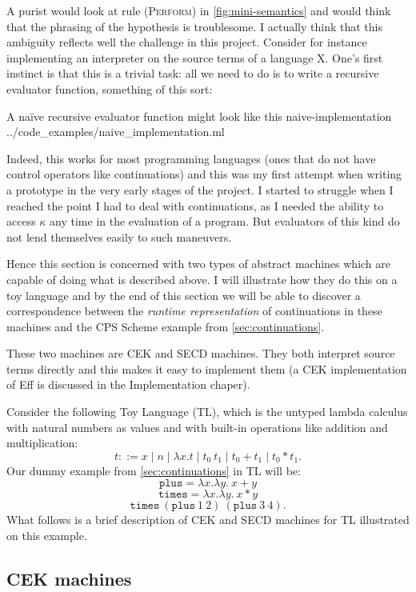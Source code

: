 \documentclass[class=article, crop=false]{standalone}
\begin{document}
A purist would look at rule \textsc{(Perform)} in \autoref{fig:mini-semantics}
and would think that the phrasing of the hypothesis is troublesome. I actually
think that this ambiguity reflects well the challenge in this project. Consider
for instance implementing an interpreter on the source terms of a language X.
One's first instinct is that this is a trivial task: all we need to do is to
write a recursive evaluator function, something of this sort:

{A naïve recursive evaluator function might look like this}
{naive-implementation}
{../code_examples/naive_implementation.ml}

Indeed, this works for most programming languages (ones that do not have control
operators like continuations) and this was my first attempt when writing a
 prototype in the very early stages of the project. I started to struggle
when I reached the point I had to deal with continuations, as I needed the
ability to access $\kappa$ any time in the evaluation of a program. But
evaluators of this kind do not lend themselves easily to such maneuvers.

Hence this section is concerned with two types of abstract machines which are
capable of doing what is described above. I will illustrate how they do this on
a toy language and by the end of this section we will be able to discover a
correspondence between the \emph{runtime representation} of continuations in
these machines and the CPS Scheme example from \autoref{sec:continuations}.

These two machines are CEK and SECD machines. They both interpret source terms
directly and this makes it easy to implement them (a CEK implementation of Eff
is discussed in the Implementation chaper).

Consider the following Toy Language (TL), which is the untyped lambda calculus
with natural numbers as values and with built-in operations like addition and
multiplication:
$$ t ::= x \mid n \mid \lambda x. t \mid t_0\ t_1 \mid t_0 + t_1 \mid t_0 * t_1.$$
Our dummy example from \autoref{sec:continuations} in TL will be:
$$ \mathtt{plus} = \lambda x. \lambda y.\ x + y $$
$$ \mathtt{times} = \lambda x. \lambda y.\ x * y $$
$$ \mathtt{times}\ (\mathtt{plus}\ 1\ 2)\ (\mathtt{plus}\ 3\ 4).$$
What follows is a brief description of CEK and SECD machines for TL illustrated
on this example.

\subsection{CEK machines}
\end{document}
